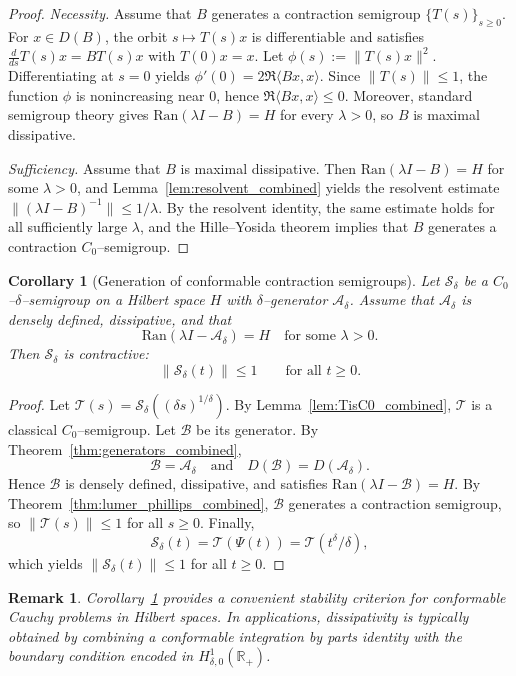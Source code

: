 \documentclass[preprint,12pt]{elsarticle}
\newtheorem{corollary}{Corollary}
\newtheorem{remark}{Remark}
\newtheorem{proof}{Proof}
\newcommand{\R}{\mathbb {R}}
\begin{document}
\begin{proof}
\emph{Necessity.}
Assume that $B$ generates a contraction semigroup $\{T(s)\}_{s\ge0}$.
For $x\in D(B)$, the orbit $s\mapsto T(s)x$ is differentiable and satisfies
$\frac{d}{ds}T(s)x=BT(s)x$ with $T(0)x=x$.
Let $\phi(s):=\|T(s)x\|^2$.
Differentiating at $s=0$ yields $\phi'(0)=2\Re\langle Bx,x\rangle$.
Since $\|T(s)\|\le1$, the function $\phi$ is nonincreasing near $0$, hence
$\Re\langle Bx,x\rangle\le0$.
Moreover, standard semigroup theory gives $\mathrm{Ran}(\lambda I-B)=H$ for every
$\lambda>0$, so $B$ is maximal dissipative.

\medskip
\emph{Sufficiency.}
Assume that $B$ is maximal dissipative.
Then $\mathrm{Ran}(\lambda I-B)=H$ for some $\lambda>0$, and
Lemma~\ref{lem:resolvent_combined} yields the resolvent estimate
$\|(\lambda I-B)^{-1}\|\le 1/\lambda$.
By the resolvent identity, the same estimate holds for all sufficiently large
$\lambda$, and the Hille--Yosida theorem implies that $B$ generates a contraction
$C_0$--semigroup.
\end{proof}

\begin{corollary}[Generation of conformable contraction semigroups]\label{cor:conformable_LP}
Let $\mathcal S_\delta$ be a $C_0$--$\delta$--semigroup on a Hilbert space $H$
with $\delta$--generator $\mathcal A_\delta$.
Assume that $\mathcal A_\delta$ is densely defined, dissipative, and that
\[
\mathrm{Ran}(\lambda I-\mathcal A_\delta)=H
\quad\text{for some }\lambda>0.
\]
Then $\mathcal S_\delta$ is contractive:
\[
\|\mathcal S_\delta(t)\|\le 1\qquad\text{for all }t\ge0.
\]
\end{corollary}

\begin{proof}
Let $\mathcal T(s)=\mathcal S_\delta((\delta s)^{1/\delta})$.
By Lemma~\ref{lem:TisC0_combined}, $\mathcal T$ is a classical $C_0$--semigroup.
Let $\mathcal B$ be its generator.
By Theorem~\ref{thm:generators_combined},
\[
\mathcal B=\mathcal A_\delta
\quad\text{and}\quad
D(\mathcal B)=D(\mathcal A_\delta).
\]
Hence $\mathcal B$ is densely defined, dissipative, and satisfies
$\mathrm{Ran}(\lambda I-\mathcal B)=H$.
By Theorem~\ref{thm:lumer_phillips_combined}, $\mathcal B$ generates a contraction
semigroup, so $\|\mathcal T(s)\|\le1$ for all $s\ge0$.
Finally,
\[
\mathcal S_\delta(t)=\mathcal T(\Psi(t))=\mathcal T(t^\delta/\delta),
\]
which yields $\|\mathcal S_\delta(t)\|\le1$ for all $t\ge0$.
\end{proof}

\begin{remark}
Corollary~\ref{cor:conformable_LP} provides a convenient stability criterion for
conformable Cauchy problems in Hilbert spaces.
In applications, dissipativity is typically obtained by combining a conformable
integration by parts identity with the boundary condition encoded in
$H_{\delta,0}^1(\R_+)$.
\end{remark}
\end{document}
